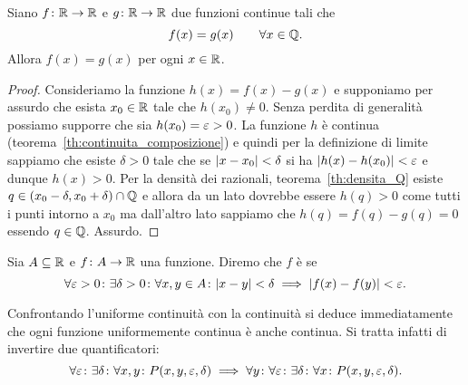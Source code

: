\begin{lemma}
\label{lm:unicita_continua}%
Siano $f\colon \mathbb R\to\mathbb R$ e $g\colon \mathbb R\to\mathbb R$
due funzioni continue tali che
\[
  f(x) = g(x) \qquad \forall x\in \mathbb Q.
\]
Allora $f(x)=g(x)$ per ogni $x\in \mathbb R$.
\end{lemma}
%
\begin{proof}
Consideriamo la funzione $h(x)=f(x)-g(x)$
e supponiamo per assurdo che esista $x_0\in \mathbb R$
tale che $h(x_0)\neq 0$.
Senza perdita di generalità possiamo supporre
che sia $h(x_0) = \varepsilon >0$.
La funzione $h$ è continua (teorema~\ref{th:continuita_composizione})
e quindi per
la definizione
di limite sappiamo che esiste $\delta>0$
tale che se ${\left|x-x_0\right|}<\delta$ si ha ${\left|h(x)-h(x_0)\right|}< \varepsilon$
e dunque $h(x)>0$.
Per la densità dei razionali, teorema~\ref{th:densita_Q}
esiste $q \in (x_0-\delta,x_0+\delta)\cap \mathbb Q$
e allora da un lato dovrebbe essere $h(q)>0$
come tutti i punti intorno a $x_0$
ma dall'altro lato sappiamo che $h(q)=f(q)-g(q)=0$
essendo $q\in \mathbb Q$. Assurdo.
\end{proof}

\begin{definition}
Sia $A\subseteq \mathbb R$ e $f\colon A \to \mathbb R$ una funzione.
Diremo che $f$ è 
se
\begin{equation}\label{eq:346963}
 \forall \varepsilon>0\colon \exists \delta>0 \colon
 \forall x,y\in A\colon
 {\left|x-y\right|}<\delta \implies {\left|f(x)-f(y)\right|}<\varepsilon.
\end{equation}
\end{definition}

Confrontando l'uniforme continuità con la continuità
si deduce immediatamente che ogni funzione
uniformemente continua è anche continua.
Si tratta infatti di invertire due quantificatori:
\[
  \forall \varepsilon \colon \exists \delta \colon \forall x,y
  \colon P(x,y,\varepsilon,\delta)
  \implies \forall y \colon \forall \varepsilon \colon \exists \delta
  \colon\forall x\colon P(x,y,\varepsilon,\delta).
\]

